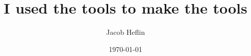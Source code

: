 \documentclass{beamer}
\title{I used the tools to make the tools}
\author{Jacob Heflin}
\date{\today}
\begin{document}
\frame{\titlepage}




\end{document}
